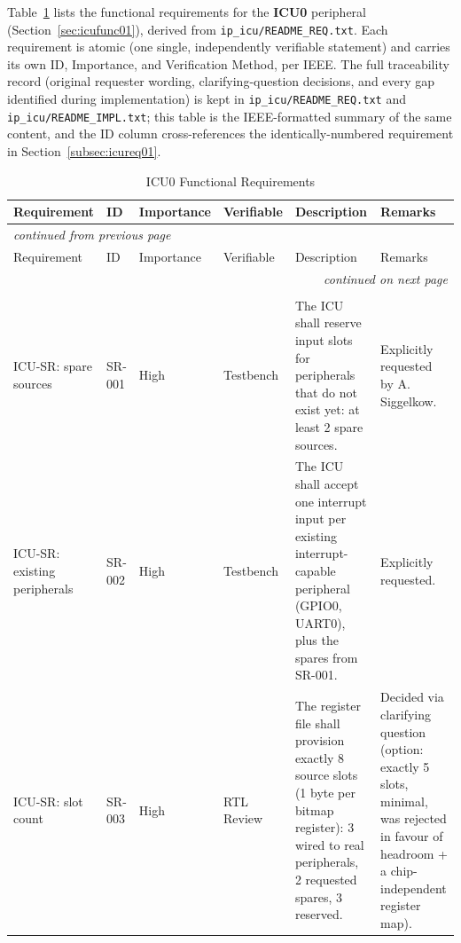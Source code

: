 Table~\ref{tab:req02icu} lists the functional requirements for the
\textbf{ICU0} peripheral (Section~\ref{sec:icufunc01}), derived from
\texttt{ip\_icu/README\_REQ.txt}. Each requirement is atomic (one single,
independently verifiable statement) and carries its own ID, Importance,
and Verification Method, per IEEE. The full traceability record
(original requester wording, clarifying-question decisions, and every
gap identified during implementation) is kept in
\texttt{ip\_icu/README\_REQ.txt} and \texttt{ip\_icu/README\_IMPL.txt};
this table is the IEEE-formatted summary of the same content, and the ID
column cross-references the identically-numbered requirement in
Section~\ref{subsec:icureq01}.

\begin{longtable}{| p{} | p{} | p{} | p{} | p{} | p{} |}
\caption{ICU0 Functional Requirements}\label{tab:req02icu}\\
\hline
Requirement & ID & Importance & Verifiable & Description & Remarks \\
\hline
\hline
\endfirsthead
\multicolumn{6}{l}{\small\itshape continued from previous page}\\
\hline
Requirement & ID & Importance & Verifiable & Description & Remarks \\
\hline
\hline
\endhead
\hline
\multicolumn{6}{r}{\small\itshape continued on next page}\\
\endfoot
\hline
\endlastfoot

\multicolumn{6}{|l|}{Source Management}\\
\hline
ICU-SR: spare sources & SR-001 & High & Testbench &
  The ICU shall reserve input slots for peripherals that do not exist
  yet: at least 2 spare sources. &
  Explicitly requested by A. Siggelkow. \\
\hline
ICU-SR: existing peripherals & SR-002 & High & Testbench &
  The ICU shall accept one interrupt input per existing
  interrupt-capable peripheral (GPIO0, UART0), plus the spares from SR-001. &
  Explicitly requested. \\
\hline
ICU-SR: slot count & SR-003 & High & RTL Review &
  The register file shall provision exactly 8 source slots (1 byte per
  bitmap register): 3 wired to real peripherals, 2 requested spares, 3
  reserved. &
  Decided via clarifying question (option: exactly 5 slots, minimal, was
  rejected in favour of headroom + a chip-independent register map). \\
\hline


\end{longtable}
